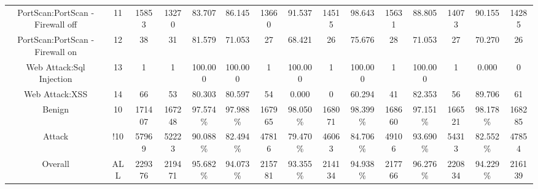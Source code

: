 \begin{table}[htb]
\begin{tabular}{@{}ccccccccccccccc@{}}
        PortScan:PortScan - Firewall off &  11 &  15853 &  13270 &  83.707 &  86.145 &  13660 &  91.537 &  14515 &  98.643 &  15631 &  88.805 &  14073 &  90.155 &  14285 \\
        PortScan:PortScan - Firewall on &  12 &  38 &  31 &  81.579 &  71.053 &  27 &  68.421 &  26 &  75.676 &  28 &  71.053 &  27 &  70.270 &  26 \\
        Web Attack:Sql Injection &  13 &  1 &  1 &  100.000 &  100.000 &  1 &  100.000 &  1 &  100.000 &  1 &  100.000 &  1 &  0.000 &  0 \\
        Web Attack:XSS &  14 &  66 &  53 &  80.303 &  80.597 &  54 &  0.000 &  0 &  60.294 &  41 &  82.353 &  56 &  89.706 &  61 \\
        Benign &  10 &  171407 &  167248 &  97.574\% &  97.988\% &  167965 &  98.050\% &  168071 &  98.399\% &  168660 &  97.151\% &  166521 &  98.178\% &  168285 \\
        Attack &  !10 &  57969 &  52223 &  90.088\% &  82.494\% &  47816 &  79.470\% &  46063 &  84.706\% &  49106 &  93.690\% &  54313 &  82.552\% &  47854 \\
        Overall &  ALL &  229376 &  219471 &  95.682\% &  94.073\% &  215781 &  93.355\% &  214134 &  94.938\% &  217766 &  96.276\% &  220834 &  94.229\% &  216139 \\
        \bottomrule
    \end{tabular}
\end{table}